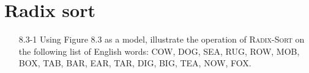 \newpage

\section{Radix sort}

\begin{enumerate}

\item[8.3-1]{Using Figure 8.3 as a model, illustrate the operation of
\textsc{Radix-Sort} on the following list of English words: COW, DOG, SEA, RUG,
ROW, MOB, BOX, TAB, BAR, EAR, TAR, DIG, BIG, TEA, NOW, FOX.}

\end{enumerate}
